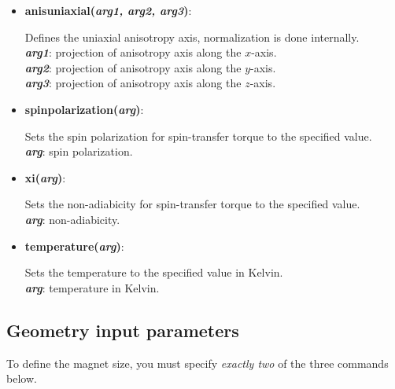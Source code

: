 \begin{itemize}
 \item {\vspace{-0.4cm}\textbf{anisuniaxial(\textit{arg1, arg2, arg3})}:
				\flushright\parbox{0.9 \textwidth}{\vspace{-0.25cm} 
				Defines the uniaxial anisotropy axis, normalization is done internally.\\
				\textbf{\textit{arg1}}: projection of anisotropy axis along the $x$-axis.\\
				\textbf{\textit{arg2}}: projection of anisotropy axis along the $y$-axis.\\
				\textbf{\textit{arg3}}: projection of anisotropy axis along the $z$-axis.
				}\flushleft}

 \item {\vspace{-0.4cm}\textbf{spinpolarization(\textit{arg})}:
				\flushright\parbox{0.9 \textwidth}{\vspace{-0.25cm} 
				Sets the spin polarization for spin-transfer torque to the specified value.\\
				\textbf{\textit{arg}}: spin polarization.
				}\flushleft}

 \item {\vspace{-0.4cm}\textbf{xi(\textit{arg})}:
				\flushright\parbox{0.9 \textwidth}{\vspace{-0.25cm} 
				Sets the non-adiabicity for spin-transfer torque to the specified value.\\
				\textbf{\textit{arg}}: non-adiabicity.
				}\flushleft}

 \item {\vspace{-0.4cm}\textbf{temperature(\textit{arg})}:
				\flushright\parbox{0.9 \textwidth}{\vspace{-0.25cm} 
				Sets the temperature to the specified value in Kelvin.\\
				\textbf{\textit{arg}}: temperature in Kelvin.
				}\flushleft}

\end{itemize}



\subsection{Geometry input parameters}
To define the magnet size, you must specify \emph{exactly two} of the three commands below.

